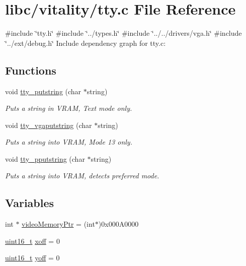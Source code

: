 \hypertarget{a00113}{}\section{libc/vitality/tty.c File Reference}
\label{a00113}
{\ttfamily \#include \char`\"{}tty.\+h\char`\"{}}\newline
{\ttfamily \#include \char`\"{}../types.\+h\char`\"{}}\newline
{\ttfamily \#include \char`\"{}../../drivers/vga.\+h\char`\"{}}\newline
{\ttfamily \#include \char`\"{}../ext/debug.\+h\char`\"{}}\newline
Include dependency graph for tty.\+c\+:
\subsection*{Functions}
\begin{DoxyCompactItemize}
\item 
void \hyperlink{a00113_a2ebb962f457a2677d70285d1c0f9be12_a2ebb962f457a2677d70285d1c0f9be12}{tty\+\_\+putstring} (char $\ast$string)
\begin{DoxyCompactList}\small\item\em Puts a string in V\+R\+AM, Text mode only. \end{DoxyCompactList}\item 
void \hyperlink{a00113_a13ff2c06d56753c5666ca56cb2d81100_a13ff2c06d56753c5666ca56cb2d81100}{tty\+\_\+vgaputstring} (char $\ast$string)
\begin{DoxyCompactList}\small\item\em Puts a string into V\+R\+AM, Mode 13 only. \end{DoxyCompactList}\item 
void \hyperlink{a00113_ade960b1320324706aac6c00cc6b1b2fe_ade960b1320324706aac6c00cc6b1b2fe}{tty\+\_\+pputstring} (char $\ast$string)
\begin{DoxyCompactList}\small\item\em Puts a string into V\+R\+AM, detects preferred mode. \end{DoxyCompactList}\end{DoxyCompactItemize}
\subsection*{Variables}
\begin{DoxyCompactItemize}
\item 
int $\ast$ \hyperlink{a00113_a3f896e9c00b9302e2287aad054199134_a3f896e9c00b9302e2287aad054199134}{video\+Memory\+Ptr} = (int$\ast$)0x000\+A0000
\item 
\hyperlink{a00095_a273cf69d639a59973b6019625df33e30_a273cf69d639a59973b6019625df33e30}{uint16\+\_\+t} \hyperlink{a00113_abaa0d20f0e52ce0d3a7d706f6ac16266_abaa0d20f0e52ce0d3a7d706f6ac16266}{xoff} = 0
\item 
\hyperlink{a00095_a273cf69d639a59973b6019625df33e30_a273cf69d639a59973b6019625df33e30}{uint16\+\_\+t} \hyperlink{a00113_a1a7539764d0ae8cd06ce45c62cf92bca_a1a7539764d0ae8cd06ce45c62cf92bca}{yoff} = 0
\end{DoxyCompactItemize}


